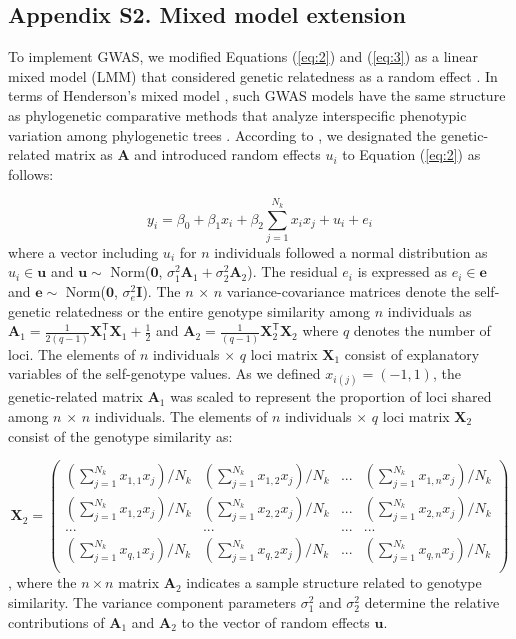 \documentclass[12pt,]{article}
\begin{document}
\medskip
\subsection*{Appendix S2. Mixed model extension}
To implement GWAS, we modified Equations (\ref{eq:2}) and (\ref{eq:3}) as a linear mixed model (LMM) that considered genetic relatedness as a random effect \citep{kang2008efficient}. In terms of Henderson's mixed model \citep{henderson1959estimation}, such GWAS models have the same structure as phylogenetic comparative methods that analyze interspecific phenotypic variation among phylogenetic trees \citep{kang2008efficient, hadfield2010general}. According to \cite{hadfield2010general}, we designated the genetic-related matrix as $\mathbf{A}$ and introduced random effects $u_i$ to Equation (\ref{eq:2}) as follows: 

\begin{equation}
y_i = \beta_0 + \beta_1x_i + \beta_2\sum^{N_{k}}_{j=1}{x_ix_j} + u_i + e_i \label{eq:s1}
\end{equation}
\noindent
where a vector including $u_i$ for $n$ individuals followed a normal distribution as $u_i \in \mathbf{u}$ and $\mathbf{u} \sim$ Norm($\mathbf{0}$, $\sigma^2_1\mathbf{A}_1+\sigma^2_2\mathbf{A}_2$). The residual $e_i$ is expressed as $e_i \in \mathbf{e}$ and $\mathbf{e} \sim$ Norm($\mathbf{0}$, $\sigma^2_e\mathbf{I}$).
The $n$ × $n$ variance-covariance matrices denote the self-genetic relatedness or the entire genotype similarity among $n$ individuals as
$\mathbf{A}_1=\frac{1}{2(q-1)}\mathbf{X}_1^\mathsf{T}\mathbf{X}_1 + \frac{1}{2}$ and 
$\mathbf{A}_2=\frac{1}{(q-1)}\mathbf{X}_2^\mathsf{T} \mathbf{X}_2$
where $q$ denotes the number of loci. The elements of $n$ individuals $\times$ $q$ loci matrix $\mathbf{X}_1$ consist of explanatory variables of the self-genotype values. As we defined $x_{i(j)} = (-1, 1)$, the genetic-related matrix $\mathbf{A}_1$ was scaled to represent the proportion of loci shared among $n$ × $n$ individuals. The elements of $n$ individuals $\times$ $q$ loci matrix $\mathbf{X}_2$ consist of the genotype similarity as:

$$\mathbf{X}_2=\left(\begin{array}{cccc}
    (\sum^{N_k}_{j=1}x_{1,1} x_j)/N_k &  (\sum^{N_k}_{j=1}x_{1,2} x_j)/N_k &  ... &  (\sum^{N_k}_{j=1}x_{1,n} x_j)/N_k \\ 
    (\sum^{N_k}_{j=1}x_{1,2} x_j)/N_k &  (\sum^{N_k}_{j=1}x_{2,2} x_j)/N_k &  ... &  (\sum^{N_k}_{j=1}x_{2,n} x_j)/N_k\\
    ... & ... & ... & ... \\
    (\sum^{N_k}_{j=1}x_{q,1} x_j)/N_k &  (\sum^{N_k}_{j=1}x_{q,2} x_j)/N_k &  ... &  (\sum^{N_k}_{j=1}x_{q,n} x_j)/N_k \\
    \end{array} \right)
$$,
where the $n \times n$ matrix $\mathbf{A}_2$ indicates a sample structure related to genotype similarity. The variance component parameters $\sigma^2_1$ and $\sigma^2_2$ determine the relative contributions of $\mathbf{A}_1$ and $\mathbf{A}_2$ to the vector of random effects $\mathbf{u}$.
\end{document}
